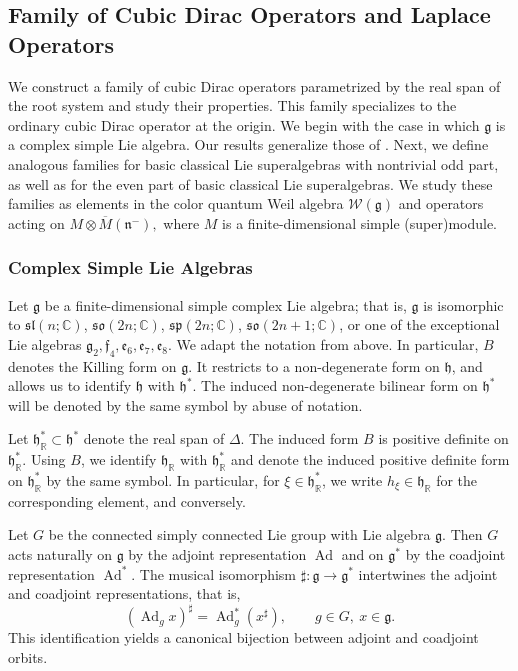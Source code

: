 \documentclass[11pt]{amsart}
\def\Weil{{\mathcal{W}(\gg)}}
\def\RR{{\mathbb R}}
\def\hh{{\mathfrak h}}
\def\gg{{\mathfrak{g}}}
\newcommand{\Ad}{\operatorname{Ad}}
\theoremstyle{plain}
\theoremstyle{remark}
\theoremstyle{definition}
\numberwithin{equation}{section}
\theoremstyle{remark}
\begin{document}
\subsection{Family of Cubic Dirac Operators and Laplace Operators}
We construct a family of cubic Dirac operators parametrized by the real span of the root system and study their properties. This family specializes to the ordinary cubic Dirac operator at the origin. We begin with the case in which $\mathfrak g$ is a complex simple Lie algebra. Our results generalize those of \cite{FT1,FT2,FT3}. Next, we define analogous families for basic classical Lie superalgebras with nontrivial odd part, as well as for the even part of basic classical Lie superalgebras. We study these families as elements in the color quantum Weil algebra $\Weil$ and operators acting on
$
M \otimes \overline{M}(\mathfrak n^-),
$
where $M$ is a finite-dimensional simple (super)module. 

\subsubsection{Complex Simple Lie Algebras} \label{subsubsec::complex_simple_Lie_algebras} Let $\gg$ be a finite-dimensional simple complex Lie algebra; that is, $\gg$ is isomorphic to
$\mathfrak{sl}(n;\mathbb C)$, $\mathfrak{so}(2n;\mathbb C)$, $\mathfrak{sp}(2n;\mathbb C)$,
$\mathfrak{so}(2n+1;\mathbb C)$, or one of the exceptional Lie algebras $\mathfrak g_2, \mathfrak f_4, \mathfrak e_6, \mathfrak e_7, \mathfrak e_8$.
We adapt the notation from above. In particular, $B$ denotes the Killing form on $\gg$. It restricts to a non-degenerate form on $\hh$, and allows us to identify $\hh$ with $\hh^{\ast}$. The induced non-degenerate bilinear form on $\hh^{\ast}$ will be denoted by the same symbol by abuse of notation.

Let $\hh_{\RR}^{\ast}\subset\hh^{\ast}$ denote the real span of $\Delta$. The induced form $B$ is positive definite on $\hh_{\RR}^{\ast}$. Using $B$, we identify $\hh_{\RR}$ with $\hh_{\RR}^{\ast}$ and denote the induced positive definite form on $\hh_{\RR}^{\ast}$ by the same symbol. In particular, for $\xi\in\hh_{\RR}^{\ast}$, we write $h_{\xi}\in\hh_{\RR}$ for the corresponding element, and conversely.

Let $G$ be the connected simply connected Lie group with Lie algebra $\gg$. Then $G$ acts naturally on $\gg$ by the adjoint representation $\Ad$ and on $\gg^{\ast}$ by the coadjoint representation $\Ad^{\ast}$. The musical isomorphism $\sharp: \gg \to \gg^{\ast}$ intertwines the adjoint and coadjoint representations, that is, 
\begin{equation}
 (\Ad_{g}x)^{\sharp}=\Ad^{\ast}_{g}(x^{\sharp}), \qquad g \in G,\ x \in \gg.
\end{equation}
This identification yields a canonical bijection between adjoint and coadjoint orbits.
\end{document}
